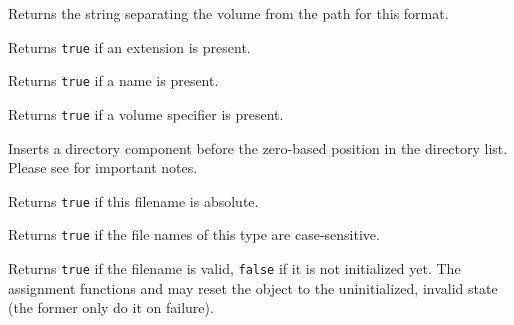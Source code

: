 \label{wxfilenamegetvolumeseparator}


Returns the string separating the volume from the path for this format.


\label{wxfilenamehasext}


Returns {\tt true} if an extension is present.


\label{wxfilenamehasname}


Returns {\tt true} if a name is present.


\label{wxfilenamehasvolume}


Returns {\tt true} if a volume specifier is present.


\label{wxfilenameinsertdir}


Inserts a directory component before the zero-based position in the directory
list. Please see  for important notes.


\label{wxfilenameisabsolute}


Returns {\tt true} if this filename is absolute.


\label{wxfilenameiscasesensitive}


Returns {\tt true} if the file names of this type are case-sensitive.


\label{wxfilenameisok}


Returns {\tt true} if the filename is valid, {\tt false} if it is not
initialized yet. The assignment functions and
 may reset the object to the uninitialized,
invalid state (the former only do it on failure).


